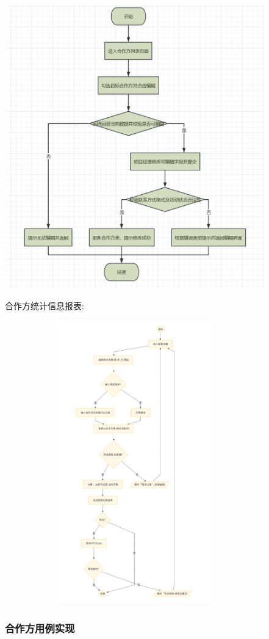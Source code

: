 \documentclass[]{article}
\let\oldincludegraphics\includegraphics
\renewcommand{\includegraphics}[2][]{%
  \begin{center}\oldincludegraphics[#1]{#2}\end{center}%
}
\begin{document}
\includegraphics[width=4.45694in,height=4.83819in]{media/media/image_2-4-3.png}

合作方统计信息报表:

\includegraphics[width=4.45694in,height=4.83819in]{media/media/image_2-4-4.png}


\hypertarget{ux7528ux4f8b-2ux5b9eux73b0}{%
  \subsubsection{合作方用例实现}\label{ux7528ux4f8b-2ux5b9eux73b0}}
\end{document}
